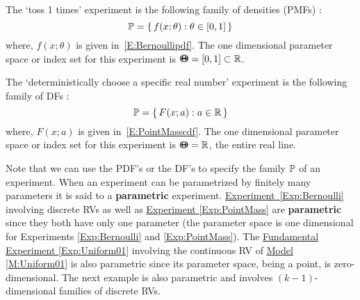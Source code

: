 \begin{Exp}[Bernoulli]\label{Exp:Bernoulli}
The `toss 1 times' experiment is the following family of densities (PMFs) :
\[
\mathbb{P} = \{ \,  f(x; \theta) :  \theta \in [0,1] \, \} 
\]
where, $f(x; \theta)$ is given in~\eqref{E:Bernoullipdf}.  The one dimensional parameter space or index set for this experiment is  ${\Theta}\mspace{-11 mu}{\Theta} = [0,1] \subset \mathbb{R}$.
\end{Exp}

\begin{Exp}\label{Exp:PointMass}
The `deterministically choose a specific real number' experiment is the following family of DFs :
\[
\mathbb{P} = \{ \,  F(x; a) :  a \in \mathbb{R} \, \} 
\]
where, $F(x; a)$ is given in~\eqref{E:PointMasscdf}.  The one dimensional parameter space or index set for this experiment is ${\Theta}\mspace{-11 mu}{\Theta} = \mathbb{R}$, the entire real line.
\end{Exp}
Note that we can use the PDF's or the DF's to specify the family $\mathbb{P}$ of an experiment.  When an experiment can be parametrized by finitely many parameters it is said to a {\bf parametric} experiment.  \hyperref[Exp:Bernoulli]{Experiment~\ref*{Exp:Bernoulli}} involving discrete RVs as well as \hyperref[Exp:PointMass]{Experiment \ref*{Exp:PointMass}} are {\bf parametric} since they both have only one parameter (the parameter space is one dimensional for Experiments \ref*{Exp:Bernoulli} and \ref*{Exp:PointMass}).   The \hyperref[Uniform01]{Fundamental Experiment \ref*{Exp:Uniform01}} involving the continuous RV of \hyperref[M:Uniform01]{Model \ref*{M:Uniform01}} is also parametric since its parameter space, being a point, is zero-dimensional.  The next example is also parametric and involves $(k-1)$-dimensional families of discrete RVs.

